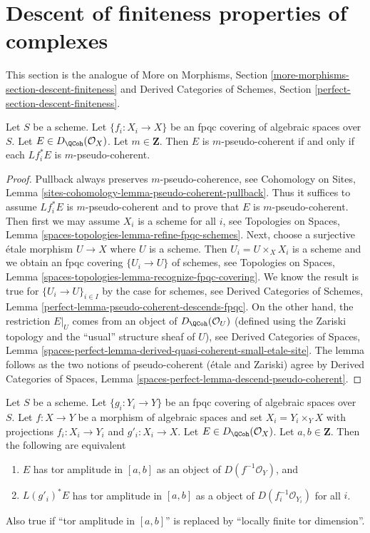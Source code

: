 \section{Descent of finiteness properties of complexes}
\label{section-descent-finiteness}

\noindent
This section is the analogue of More on Morphisms,
Section \ref{more-morphisms-section-descent-finiteness}
and
Derived Categories of Schemes, Section
\ref{perfect-section-descent-finiteness}.

\begin{lemma}
\label{lemma-pseudo-coherent-descends-fpqc}
Let $S$ be a scheme. Let $\{f_i : X_i \to X\}$ be an fpqc covering of
algebraic spaces over $S$. Let $E \in D_\QCoh(\mathcal{O}_X)$.
Let $m \in \mathbf{Z}$. Then $E$ is $m$-pseudo-coherent if and only if each
$Lf_i^*E$ is $m$-pseudo-coherent.
\end{lemma}

\begin{proof}
Pullback always preserves $m$-pseudo-coherence, see
Cohomology on Sites, Lemma
\ref{sites-cohomology-lemma-pseudo-coherent-pullback}.
Thus it suffices to assume $Lf_i^*E$ is $m$-pseudo-coherent
and to prove that $E$ is $m$-pseudo-coherent.
Then first we may assume $X_i$ is a scheme for all $i$, see
Topologies on Spaces, Lemma \ref{spaces-topologies-lemma-refine-fpqc-schemes}.
Next, choose a  surjective \'etale morphism $U \to X$ where $U$ is a scheme.
Then $U_i = U \times_X X_i$ is a scheme and we obtain an fpqc covering
$\{U_i \to U\}$ of schemes, see
Topologies on Spaces, Lemma
\ref{spaces-topologies-lemma-recognize-fpqc-covering}.
We know the result is true for
$\{U_i \to U\}_{i \in I}$ by the case for schemes, see
Derived Categories of Schemes, Lemma
\ref{perfect-lemma-pseudo-coherent-descends-fpqc}.
On the other hand, the restriction $E|_U$ comes from
an object of $D_\QCoh(\mathcal{O}_U)$ (defined using the Zariski
topology and the ``usual'' structure sheaf of $U$), see
Derived Categories of Spaces, Lemma
\ref{spaces-perfect-lemma-derived-quasi-coherent-small-etale-site}.
The lemma follows as the two notions of pseudo-coherent
(\'etale and Zariski) agree by
Derived Categories of Spaces,
Lemma \ref{spaces-perfect-lemma-descend-pseudo-coherent}.
\end{proof}

\begin{lemma}
\label{lemma-tor-amplitude-descends-fppf}
Let $S$ be a scheme. Let $\{g_i : Y_i \to Y\}$ be an fpqc covering of
algebraic spaces over $S$. Let $f : X \to Y$ be a morphism of algebraic
spaces and set $X_i = Y_i \times_Y X$ with projections $f_i : X_i \to Y_i$
and $g'_i : X_i \to X$. Let $E \in D_\QCoh(\mathcal{O}_X)$.
Let $a, b \in \mathbf{Z}$. Then the following are equivalent
\begin{enumerate}
\item $E$ has tor amplitude in $[a, b]$ as an object of
$D(f^{-1}\mathcal{O}_Y)$, and
\item $L(g'_i)^*E$ has tor amplitude in $[a, b]$ as a object of
$D(f_i^{-1}\mathcal{O}_{Y_i})$ for all $i$.
\end{enumerate}
Also true if ``tor amplitude in $[a, b]$'' is replaced by
``locally finite tor dimension''.
\end{lemma}


